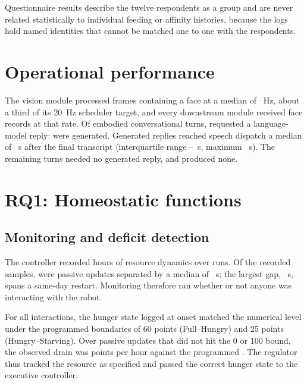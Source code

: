Questionnaire results describe the twelve respondents as a group and are never related statistically to individual feeding or affinity histories, because the logs hold \CoreNamedIdentities{} named identities that cannot be matched one to one with the respondents.

\section{Operational performance}
\label{sec:results-operations}

The vision module processed frames containing a face at a median of \CoreOpsVisionHz{}~Hz, about a third of its 20~Hz scheduler target, and every downstream module received face records at that rate. Of \CoreOpsTurns{} embodied conversational turns, \CoreOpsLLMRequests{} requested a language-model reply: \CoreOpsLLMTurns{} were generated. Generated replies reached speech dispatch a median of \CoreOpsLatencyMedian{}~s after the final transcript (interquartile range \CoreOpsLatencyQOne{}--\CoreOpsLatencyQThree{}~s, maximum \CoreOpsLatencyMax{}~s). The remaining \CoreOpsLocalTurns{} turns needed no generated reply, and \CoreOpsNoResponseTurns{} produced none.

\section{RQ1: Homeostatic functions}
\label{subsec:results-rq1}

\subsection{Monitoring and deficit detection}

The controller recorded \CoreRecordedHours{} hours of resource dynamics over \CoreMonitoredRuns{} runs. Of the \CoreResourceSamples{} recorded samples, \CorePassiveSamples{} were passive updates separated by a median of \CorePassiveGapMedian{}~s; the largest gap, \CorePassiveGapMax{}~s, spans a same-day restart. Monitoring therefore ran whether or not anyone was interacting with the robot.

For all \CoreInteractions{} interactions, the hunger state logged at onset matched the numerical level under the programmed boundaries of 60 points (Full--Hungry) and 25 points (Hungry--Starving). Over passive updates that did not hit the 0 or 100 bound, the observed drain was \CoreObservedDrain{} points per hour against the programmed \CoreNominalDrain{}. The regulator thus tracked the resource as specified and passed the correct hunger state to the executive controller.

